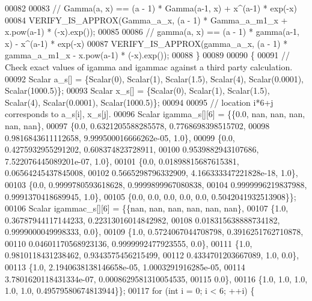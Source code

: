 \begin{DoxyCode}
00082 
00083       \textcolor{comment}{// Gamma(a, x) == (a - 1) * Gamma(a-1, x) + x^(a-1) * exp(-x)}
00084       VERIFY\_IS\_APPROX(Gamma\_a\_x, (a - 1) * Gamma\_a\_m1\_x + x.pow(a-1) * (-x).exp());
00085 
00086       \textcolor{comment}{// gamma(a, x) == (a - 1) * gamma(a-1, x) - x^(a-1) * exp(-x)}
00087       VERIFY\_IS\_APPROX(gamma\_a\_x, (a - 1) * gamma\_a\_m1\_x - x.pow(a-1) * (-x).exp());
00088     \}
00089 
00090     \{
00091       \textcolor{comment}{// Check exact values of igamma and igammac against a third party calculation.}
00092       Scalar a\_s[] = \{Scalar(0), Scalar(1), Scalar(1.5), Scalar(4), Scalar(0.0001), Scalar(1000.5)\};
00093       Scalar x\_s[] = \{Scalar(0), Scalar(1), Scalar(1.5), Scalar(4), Scalar(0.0001), Scalar(1000.5)\};
00094 
00095       \textcolor{comment}{// location i*6+j corresponds to a\_s[i], x\_s[j].}
00096       Scalar igamma\_s[][6] = \{\{0.0, nan, nan, nan, nan, nan\},
00097                               \{0.0, 0.6321205588285578, 0.7768698398515702,
00098                               0.9816843611112658, 9.999500016666262e-05, 1.0\},
00099                               \{0.0, 0.4275932955291202, 0.608374823728911,
00100                               0.9539882943107686, 7.522076445089201e-07, 1.0\},
00101                               \{0.0, 0.01898815687615381, 0.06564245437845008,
00102                               0.5665298796332909, 4.166333347221828e-18, 1.0\},
00103                               \{0.0, 0.9999780593618628, 0.9999899967080838,
00104                               0.9999996219837988, 0.9991370418689945, 1.0\},
00105                               \{0.0, 0.0, 0.0, 0.0, 0.0, 0.5042041932513908\}\};
00106       Scalar igammac\_s[][6] = \{\{nan, nan, nan, nan, nan, nan\},
00107                               \{1.0, 0.36787944117144233, 0.22313016014842982,
00108                                 0.018315638888734182, 0.9999000049998333, 0.0\},
00109                               \{1.0, 0.5724067044708798, 0.3916251762710878,
00110                                 0.04601170568923136, 0.9999992477923555, 0.0\},
00111                               \{1.0, 0.9810118431238462, 0.9343575456215499,
00112                                 0.4334701203667089, 1.0, 0.0\},
00113                               \{1.0, 2.1940638138146658e-05, 1.0003291916285e-05,
00114                                 3.7801620118431334e-07, 0.0008629581310054535,
00115                                 0.0\},
00116                               \{1.0, 1.0, 1.0, 1.0, 1.0, 0.49579580674813944\}\};
00117       \textcolor{keywordflow}{for} (\textcolor{keywordtype}{int} i = 0; i < 6; ++i) \{

\end{DoxyCode}
